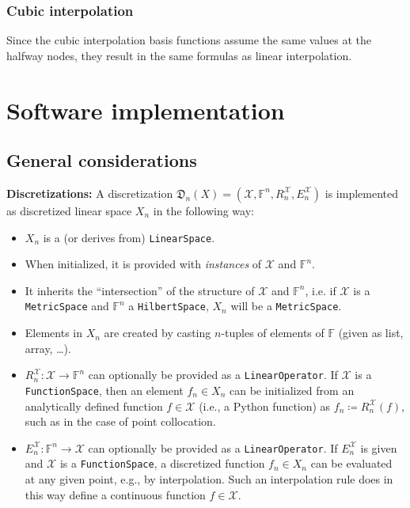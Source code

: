 \documentclass[a4paper]{paper}
\newcommand*{\SPC}[1]{{\ensuremath{\mathscr{#1}}}}
\newcommand*{\SPCX}{\SPC{X}}
\newcommand*{\FIELD}{{\ensuremath{\mathbb{F}}}}
\newcommand*{\Fn}{{\ensuremath{\FIELD^n}}}
\newcommand*{\EXT}[2]{\ensuremath{E_{#1}^{#2}}}
\newcommand*{\REST}[2]{\ensuremath{R_{#1}^{#2}}}
\newcommand*{\RnX}{{\ensuremath{\REST{n}{\SPC{X}}}}}
\newcommand*{\EnX}{{\ensuremath{\EXT{n}{\SPC{X}}}}}
\newcommand*{\DISCR}[2]{{\ensuremath{\mathfrak{D}_{#1}(#2)}}}
\newcommand*{\DISCRnX}{\DISCR{n}{X}}
\DeclareMathOperator{\DEFEQ}{{\coloneqq}}
\begin{document}
\subsubsection{Cubic interpolation}
\label{subsubsec:specif:deriv:cubic}

Since the cubic interpolation basis functions assume the same values at the halfway nodes, they result in the same 
formulas as linear interpolation.


\section{Software implementation}
\label{sec:soft}



\subsection{General considerations}
\label{subsec:soft:general}
%
\textbf{Discretizations:}
A discretization $\DISCRnX = (\SPCX, \Fn, \RnX, \EnX)$ is implemented as discretized linear 
space $X_n$ in the following way:
%
\begin{itemize}
 \item $X_n$ is a (or derives from) \texttt{LinearSpace}.
 \item When initialized, it is provided with \emph{instances} of $\SPCX$ and $\Fn$.
 \item It inherits the ``intersection'' of the structure of $\SPCX$ and $\Fn$, i.e. if $\SPCX$ is a 
 \texttt{MetricSpace} and $\Fn$ a \texttt{HilbertSpace}, $X_n$ will be a \texttt{MetricSpace}.
 \item Elements in $X_n$ are created by casting $n$-tuples of elements of $\FIELD$ (given as list, array, \dots).
 \item $\RnX \colon \SPCX \to \Fn$ 
   can optionally be provided as a \texttt{LinearOperator}. If $\SPCX$ is a \texttt{FunctionSpace},
   then an element $f_n \in X_n$ can be initialized from an analytically defined function $f \in \SPCX$ 
   (i.e., a Python function) as $f_n \DEFEQ  \RnX(f)$, such as in the case of point collocation.
 \item $\EnX \colon \Fn \to \SPCX$ can optionally be provided as a \texttt{LinearOperator}. 
   If $\EnX$ is given and $\SPCX$ is a \texttt{FunctionSpace}, 
   a discretized function $f_n \in X_n$ can be evaluated at any given point, e.g., by interpolation. 
   Such an interpolation rule does in this way define a continuous function $f \in \SPCX$.
\end{itemize}
\end{document}
